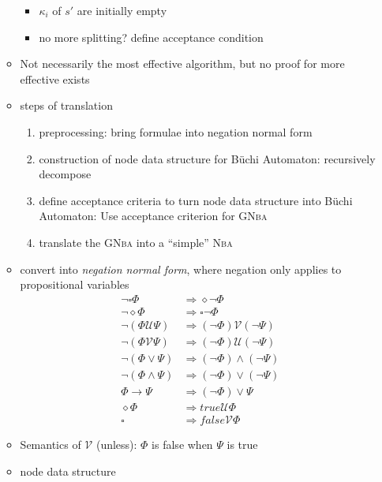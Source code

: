 \documentclass[a4paper, 10pt]{article}
\begin{document}
\begin{itemize}
\begin{itemize}
\begin{itemize}
            \item $\kappa_i$ of $s'$ are initially empty
            \item no more splitting? define acceptance condition
        \end{itemize}
        \item Not necessarily the most effective algorithm, but no proof for more effective exists
        \item steps of translation
        \begin{enumerate}
            \item preprocessing: bring formulae into negation normal form
            \item construction of node data structure for Büchi Automaton: recursively decompose
            \item define acceptance criteria to turn node data structure into Büchi Automaton: Use acceptance criterion for \textsc{GNba}
            \item translate the \textsc{GNba} into a ``simple'' \textsc{Nba}
        \end{enumerate}
        \item convert into \emph{negation normal form}, where negation only applies to propositional variables
        \begin{align*}
        \neg\square\Phi             &\Rightarrow \diamond\neg\Phi \\
        \neg\diamond\Phi            &\Rightarrow \square\neg\Phi \\
        \neg(\Phi \mathcal{U}\Psi)  &\Rightarrow (\neg\Phi)\mathcal{V}(\neg\Psi) \\
        \neg(\Phi \mathcal{V}\Psi)  &\Rightarrow (\neg\Phi)\mathcal{U}(\neg\Psi) \\
        \neg(\Phi\vee\Psi)          &\Rightarrow (\neg\Phi)\wedge(\neg\Psi) \\
        \neg(\Phi\wedge\Psi)        &\Rightarrow (\neg\Phi)\vee(\neg\Psi) \\
        \Phi\to\Psi                 &\Rightarrow (\neg\Phi)\vee\Psi \\
        \diamond\Phi                &\Rightarrow  true \mathcal{U}\Phi \\
        \square                     &\Rightarrow  false \mathcal{V}\Phi
        \end{align*}
        \item Semantics of $\mathcal{V}$ (unless): $\Phi$ is false when $\Psi$ is true 
        \item node data structure

\end{itemize}
\end{itemize}
\end{document}
